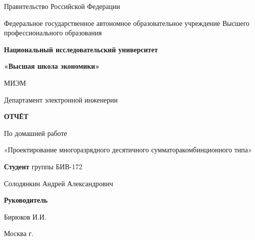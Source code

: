 \begin{titlepage}
	\begin{center}
		Правительство Российской Федерации
	\end{center}

	\begin{center}
	Федеральное государственное автономное образовательное учреждение
	Высшего профессионального образования
	
	\end{center}
	
	\begin{center}
		\textbf{Национальный исследовательский университет}
		
		\textbf{«Высшая школа экономики»}
	\end{center}
	\begin{center}
		МИЭМ
	\end{center}
	\begin{center}
		Департамент электронной инженерии
	\end{center}
	\vspace{1ex}
	\begin{center}
		\textbf{ОТЧЁТ}
		
		По домашней работе
		
		«Проектирование многоразрядного десятичного сумматоракомбинционного типа»
	\end{center}	
	
	\vspace{10ex}
	\begin{flushright}
		\textbf{Студент} группы БИВ-172
		
		Солодянкин Андрей Александрович		
	\end{flushright}
	\vspace{3ex}
	\begin{flushright}
		\textbf{Руководитель} 
		
		Бирюков И.И.

			
	\end{flushright}
	\vfill
	\begin{center}
		Москва \the\year г.
	\end{center}
\end{titlepage}